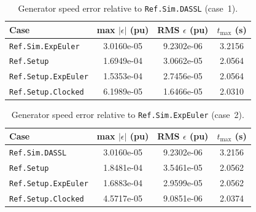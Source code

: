 \begin{table}[ht]
\centering
\caption{Generator speed error relative to \texttt{Ref.Sim.DASSL} (case~1).}
\label{tab:speed_error_summary}
\begin{tabular}{lccc}
\hline
Case & max $|\epsilon|$ (pu) & RMS $\epsilon$ (pu) & $t_{\max}$ (s) \\
\hline
\texttt{Ref.Sim.ExpEuler} & 3.0160e-05 & 9.2302e-06 & 3.2156 \\
\texttt{Ref.Setup} & 1.6949e-04 & 3.0662e-05 & 2.0564 \\
\texttt{Ref.Setup.ExpEuler} & 1.5353e-04 & 2.7456e-05 & 2.0564 \\
\texttt{Ref.Setup.Clocked} & 6.1989e-05 & 1.6466e-05 & 2.0310 \\
\hline
\end{tabular}
\end{table}

\begin{table}[ht]
\centering
\caption{Generator speed error relative to \texttt{Ref.Sim.ExpEuler} (case~2).}
\label{tab:speed_error_summary_fig5}
\begin{tabular}{lccc}
\hline
Case & max $|\epsilon|$ (pu) & RMS $\epsilon$ (pu) & $t_{\max}$ (s) \\
\hline
\texttt{Ref.Sim.DASSL} & 3.0160e-05 & 9.2302e-06 & 3.2156 \\
\texttt{Ref.Setup} & 1.8481e-04 & 3.5461e-05 & 2.0562 \\
\texttt{Ref.Setup.ExpEuler} & 1.6883e-04 & 2.9599e-05 & 2.0562 \\
\texttt{Ref.Setup.Clocked} & 4.5717e-05 & 9.0851e-06 & 2.0374 \\
\hline
\end{tabular}
\end{table}
